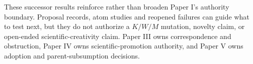 These successor results reinforce rather than broaden Paper I's authority boundary. Proposal records, atom studies and reopened failures can guide what to test next, but they do not authorize a $K/W/M$ mutation, novelty claim, or open-ended scientific-creativity claim. Paper III owns correspondence and obstruction, Paper IV owns scientific-promotion authority, and Paper V owns adoption and parent-subsumption decisions.
